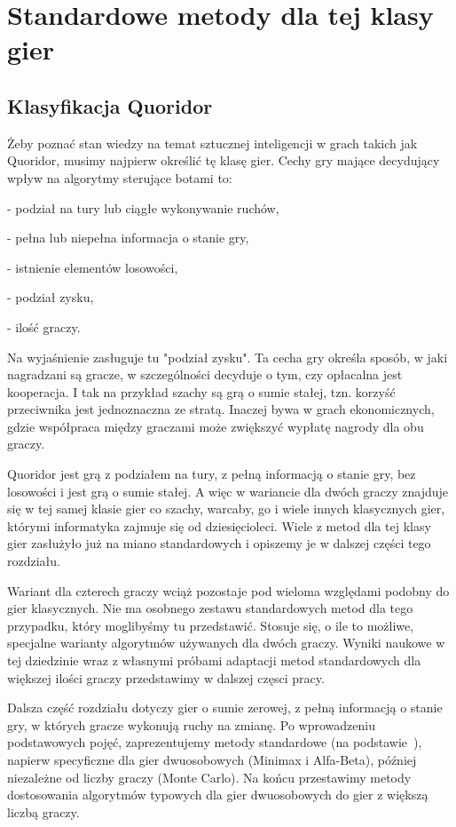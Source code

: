 \documentclass{pracamgr}
\begin{document}
\chapter{Standardowe metody dla tej klasy gier}

\section{Klasyfikacja Quoridor}

Żeby poznać stan wiedzy na temat sztucznej inteligencji w grach takich jak Quoridor, musimy najpierw określić tę klasę gier.
Cechy gry mające decydujący wpływ na algorytmy sterujące botami to:

 - podział na tury lub ciągłe wykonywanie ruchów,

 - pełna lub niepełna informacja o stanie gry,

 - istnienie elementów losowości,

 - podział zysku,

 - ilość graczy.

Na wyjaśnienie zasługuje tu "podział zysku". Ta cecha gry określa sposób, w jaki nagradzani są gracze, w szczególności decyduje o tym, czy opłacalna jest kooperacja. I tak na przykład szachy są grą o sumie stałej, tzn. korzyść przeciwnika jest jednoznaczna ze stratą. Inaczej bywa w grach ekonomicznych, gdzie współpraca między graczami może zwiększyć wypłatę nagrody dla obu graczy.

Quoridor jest grą z podziałem na tury, z pełną informacją o stanie gry, bez losowości i jest grą o sumie stałej. A więc w wariancie dla dwóch graczy znajduje się w tej samej klasie gier co szachy, warcaby, go i wiele innych klasycznych gier, którymi informatyka zajmuje się od dziesięcioleci. Wiele z metod dla tej klasy gier zasłużyło już na miano standardowych i opiszemy je w dalszej części tego rozdziału.

Wariant dla czterech graczy wciąż pozostaje pod wieloma względami podobny do gier klasycznych. Nie ma osobnego zestawu standardowych metod dla tego przypadku, który moglibyśmy tu przedstawić. Stosuje się, o ile to możliwe, specjalne warianty algorytmów używanych dla dwóch graczy. Wyniki naukowe w tej dziedzinie wraz z własnymi próbami adaptacji metod standardowych dla większej ilości graczy przedstawimy w dalszej częsci pracy.

Dalsza część rozdziału dotyczy gier o sumie zerowej, z pełną informacją o stanie gry, w których gracze wykonują ruchy na zmianę.
Po wprowadzeniu podstawowych pojęć, zaprezentujemy metody standardowe (na podstawie~\cite{pawlewicz}), napierw specyficzne dla gier dwuosobowych (Minimax i Alfa-Beta), później niezależne od liczby graczy (Monte Carlo).
Na końcu przestawimy metody dostosowania algorytmów typowych dla gier dwuosobowych do gier z większą liczbą graczy.
\end{document}
